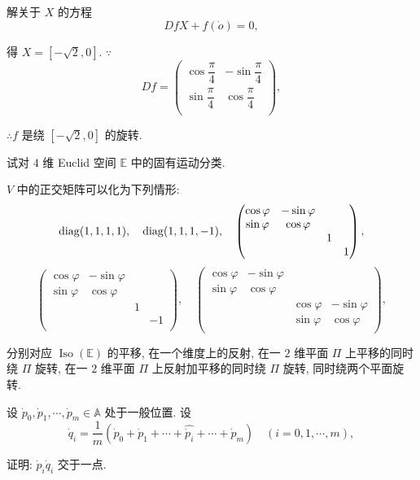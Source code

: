 \documentclass{ctexart}
\begin{document}
\begin{solution}
    解关于 $X$ 的方程
    \[DfX+f(\dot{o})=0,\]

    得 $X=[-\sqrt{2},0]$. $\because$
    \[Df=\begin{pmatrix}
        \cos\dfrac{\pi}{4} & -\sin\dfrac{\pi}{4} \\[8pt]
        \sin\dfrac{\pi}{4} & \cos\dfrac{\pi}{4} \\
    \end{pmatrix},\]

    $\therefore f$ 是绕 $[-\sqrt{2},0]$ 的旋转.
\end{solution}
\begin{exercise}%
    试对 $4$ 维 Euclid 空间 $\mathbb{E}$ 中的固有运动分类.
\end{exercise}
\begin{solution}
    $V$ 中的正交矩阵可以化为下列情形:
    \[\operatorname{diag} (1,1,1,1),\quad\operatorname{diag} (1,1,1,-1),\quad\begin{pmatrix}
        \cos\varphi & -\sin\varphi \\
        \sin\varphi & \cos\varphi \\
        && 1 \\
        &&& 1 \\
    \end{pmatrix},\]
    \[\begin{pmatrix}
        \cos\varphi & -\sin\varphi \\
        \sin\varphi & \cos\varphi \\
        && 1 \\
        &&& -1 \\
    \end{pmatrix},\quad\begin{pmatrix}
        \cos\varphi & -\sin\varphi \\
        \sin\varphi & \cos\varphi \\
        && \cos\varphi & -\sin\varphi \\
        && \sin\varphi & \cos\varphi \\
    \end{pmatrix},\]

    分别对应 $\operatorname{Iso}(\mathbb{E})$ 的平移, 在一个维度上的反射, 在一 $2$ 维平面 $\varPi$ 上平移的同时绕 $\varPi$ 旋转, 在一 $2$ 维平面 $\varPi$ 上反射加平移的同时绕 $\varPi$ 旋转, 同时绕两个平面旋转.
\end{solution}
\begin{exercisec}%
    设 $\dot{p}_0,\dot{p}_1,\cdots,\dot{p}_m\in\mathbb{A}$ 处于一般位置. 设
    \[\dot{q}_i=\dfrac{1}{m}(\dot{p}_0+\dot{p}_1+\cdots+\widehat{\dot{p}_i}+\cdots+\dot{p}_m)\quad (i=0,1,\cdots,m),\]

    证明: $\dot{p}_i\dot{q}_i$ 交于一点.
\end{exercisec}
\end{document}
